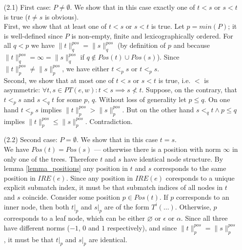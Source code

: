 \documentclass[AMA,STIX1COL]{WileyNJD-v2}
\newcommand{\IRE}{I\!RE}
\newcommand{\pnorm}[2]{\|{#1}\|^{pos}_{#2}}
\begin{document}
\begin{proofEnd}
\begin{itemize}[itemsep=0.5em]
            \begin{itemize}[itemsep=0.5em]
                \item[(2.1)] First case: $P \neq \emptyset$.
                    We show that in this case exactly one of $t < s$ or $s < t$ is true
                    ($t \neq s$ is obvious).
                    \\[0.5em]
                    First, we show that at least one of $t < s$ or $s < t$ is true.
                    Let $p = min(P)$; it is well-defined since $P$ is non-empty, finite and lexicographically ordered.
                    For all $q < p$ we have $\pnorm{t}{q} = \pnorm{s}{q}$ (by definition of $p$
                    and because $\pnorm{t}{q} = \infty = \pnorm{s}{q}$ if $q \not\in Pos(t) \cup Pos(s)$).
                    Since $\pnorm{t}{p} \neq \pnorm{s}{p}$, we have either $t <_p s$ or $t <_p s$.
                    \\[0.5em]
                    Second, we show that at most one of $t < s$ or $s < t$ is true,
                    i.e. $<$ is asymmetric: $\forall t, s \in PT(e,w) : t < s \implies s \not< t$.
                    Suppose, on the contrary, that $t <_p s$ and $s <_q t$ for some $p$, $q$.
                    Without loss of generality let $p \leq q$.
                    On one hand $t <_p s$ implies $\pnorm{t}{p} > \pnorm{s}{p}$.
                    But on the other hand $s <_q t \wedge p \leq q$ implies $\pnorm{t}{p} \leq \pnorm{s}{p}$.
                    Contradiction.

                \item[(2.2)] Second case: $P = \emptyset$.
                    We show that in this case $t = s$.
                    \\[0.5em]
                    We have $Pos(t) = Pos(s)$ --- otherwise there is a position with norm $\infty$ in only one of the trees.
                    Therefore $t$ and $s$ have identical node structure.
                    By lemma \ref{lemma_positions} any position in $t$ and $s$ corresponds to the same position in $\IRE(e)$.
                    Since any position in $\IRE(e)$ coresponds to a unique explicit submatch index,
                    it must be that submatch indices of all nodes in $t$ and $s$ coincide.
                    Consider some position $p \in Pos(t)$.
                    If $p$ corresponds to an inner node, then both $t|_p$ and $s|_p$ are of the form $T^i(\hdots)$.
                    Otherwise, $p$ corresponds to a leaf node, which can be either $\varnothing$ or $\epsilon$ or $\alpha$.
                    Since all three have different norms ($-1$, $0$ and $1$ respectively),
                    and since $\pnorm{t}{p} = \pnorm{s}{p}$, it must be that $t|_p$ and $s|_p$ are identical.
            \end{itemize}
    \end{itemize}
\end{proofEnd}
\vspace{-0.5em}
\end{document}
